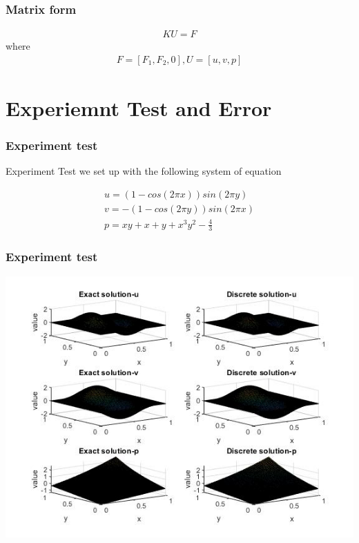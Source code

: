 \documentclass[11pt]{beamer}
\numberwithin{equation}{section}
\theoremstyle{plain}
\theoremstyle{definition}
\theoremstyle{remark}
\begin{document}
\begin{frame}\frametitle{Matrix form}
\begin{align*}
KU=F
\end{align*} 
where 
\begin{align*}
F=[F_1, F_2, 0],U=[u,v,p]
\end{align*}

\end{frame}

\section{Experiemnt Test and Error}

\begin{frame}\frametitle{Experiment test}
Experiment Test we set up with the following system of equation 

\begin{align*}
u=(1-cos(2\pi x))sin(2 \pi y) \\
v=-(1-cos(2\pi y))sin(2 \pi x) \\
p=xy+x+y+x^3y^2-\frac{4}{3}
\end{align*}
\end{frame}
\begin{frame}\frametitle{Experiment test}
\begin{center}
\includegraphics[scale=0.45]{2}
\end{center}
\end{frame}
\end{document}
